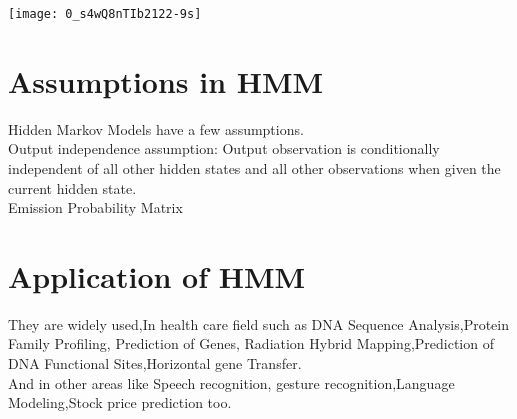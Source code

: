 \documentclass[a4paper,10pt]{article}
\begin{document}
\texttt{[image: 0\_s4wQ8nTIb2122-9s]} 

\section{Assumptions in HMM}
Hidden Markov Models have a few assumptions.
\\
Output independence assumption: Output observation is conditionally independent of all other hidden states and all other observations when given the current hidden state.
\\
Emission Probability Matrix 

\section{Application of HMM}
They are widely used,In health care field such as DNA Sequence Analysis,Protein Family Profiling, Prediction of Genes, Radiation Hybrid Mapping,Prediction of DNA Functional Sites,Horizontal gene Transfer.
\\
And in other areas like Speech recognition, gesture recognition,Language Modeling,Stock price  prediction too. 
\end{document}

